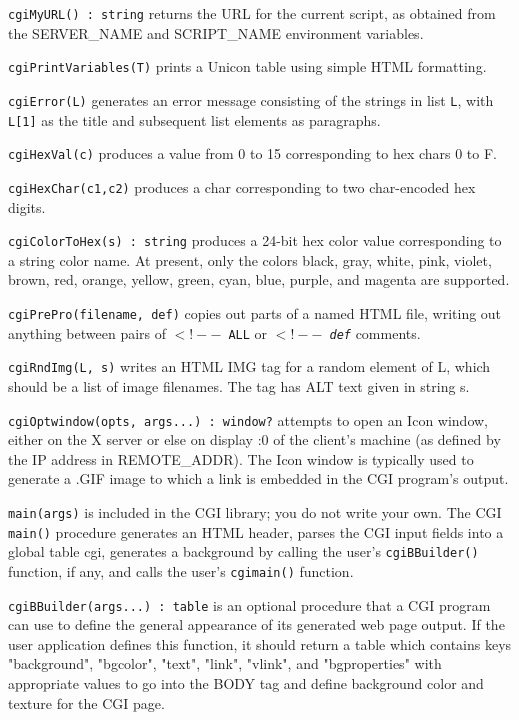 \texttt{cgiMyURL() : string} returns the URL for the current script, as
obtained from the SERVER\_NAME and SCRIPT\_NAME environment variables. 

\texttt{cgiPrintVariables(T)} prints a Unicon table
using simple HTML formatting. 

\texttt{cgiError(L)} generates an error message consisting of the
strings in list \texttt{L}, with \texttt{L[1]} as the title and
subsequent list elements as paragraphs.

\texttt{cgiHexVal(c)} produces a value from 0 to 15 corresponding to
hex chars 0 to F. 

\texttt{cgiHexChar(c1,c2)} produces a char corresponding to
two char-encoded hex digits. 

\texttt{cgiColorToHex(s) : string} produces a 24-bit hex color value
corresponding to a string color name. At present, only the colors
black, gray, white, pink, violet, brown, red, orange, yellow, green,
cyan, blue, purple, and magenta are supported. 

\texttt{cgiPrePro(filename, def)} copies out parts of a
named HTML file, writing out anything between pairs of \texttt{$<!--$ ALL}
or \texttt{$<!--$ {\em def\/}} comments.

\texttt{cgiRndImg(L, s)} writes an HTML IMG tag for a random element of
L, which should be a list of image filenames. The tag has ALT text
given in string s. 

\texttt{cgiOptwindow(opts, args...) : window?} attempts to open an Icon
window, either on the X server or else on display :0 of the
client's machine (as defined by the IP address in
REMOTE\_ADDR). The Icon window is typically used to generate a .GIF
image to which a link is embedded in the CGI
program's output. 

\texttt{main(args)} is included in the CGI library; you do not write
your own. The CGI \texttt{main()} procedure generates an HTML header,
parses the CGI input fields into a global table cgi, generates a
background by calling the user's
\texttt{cgiBBuilder()} function, if any, and calls the
user's \texttt{cgimain()} function. 

\texttt{cgiBBuilder(args...) : table} is an optional procedure that a
CGI program can use to define the general appearance of its
generated web page output. If the user application defines this
function, it should return a table which contains keys
"background",
"bgcolor",
"text", "link",
"vlink", and
"bgproperties" with appropriate values to
go into the BODY tag and define background color and texture for the
CGI page. 

